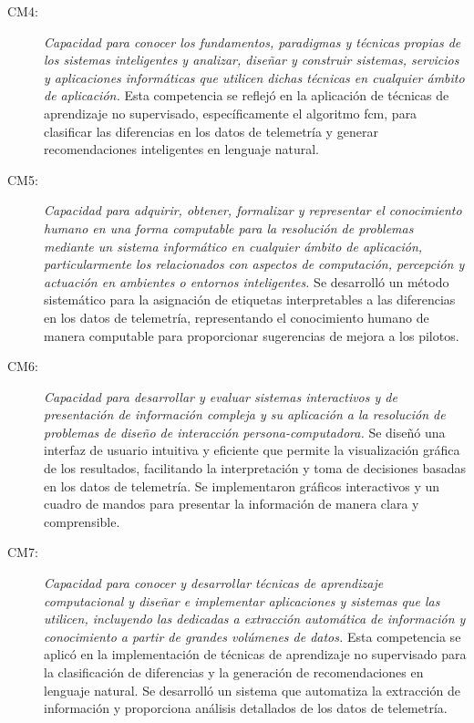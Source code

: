 \begin{description}
\item[CM4:] \emph{Capacidad para conocer los fundamentos, paradigmas y técnicas propias de los sistemas inteligentes y analizar, diseñar y construir sistemas, servicios y aplicaciones informáticas que utilicen dichas técnicas en cualquier ámbito de aplicación.} Esta competencia se reflejó en la aplicación de técnicas de aprendizaje no supervisado, específicamente el algoritmo \ac{fcm}, para clasificar las diferencias en los datos de telemetría y generar recomendaciones inteligentes en lenguaje natural.

\item[CM5:] \emph{Capacidad para adquirir, obtener, formalizar y representar el conocimiento humano en una forma computable para la resolución de problemas mediante un sistema informático en cualquier ámbito de aplicación, particularmente los relacionados con aspectos de computación, percepción y actuación en ambientes o entornos inteligentes.} Se desarrolló un método sistemático para la asignación de etiquetas interpretables a las diferencias en los datos de telemetría, representando el conocimiento humano de manera computable para proporcionar sugerencias de mejora a los pilotos.

\item[CM6:] \emph{Capacidad para desarrollar y evaluar sistemas interactivos y de presentación de información compleja y su aplicación a la resolución de problemas de diseño de interacción persona-computadora.} Se diseñó una interfaz de usuario intuitiva y eficiente que permite la visualización gráfica de los resultados, facilitando la interpretación y toma de decisiones basadas en los datos de telemetría. Se implementaron gráficos interactivos y un cuadro de mandos para presentar la información de manera clara y comprensible.

\item[CM7:] \emph{Capacidad para conocer y desarrollar técnicas de aprendizaje computacional y diseñar e implementar aplicaciones y sistemas que las utilicen, incluyendo las dedicadas a extracción automática de información y conocimiento a partir de grandes volúmenes de datos.} Esta competencia se aplicó en la implementación de técnicas de aprendizaje no supervisado para la clasificación de diferencias y la generación de recomendaciones en lenguaje natural. Se desarrolló un sistema que automatiza la extracción de información y proporciona análisis detallados de los datos de telemetría.
\end{description}

